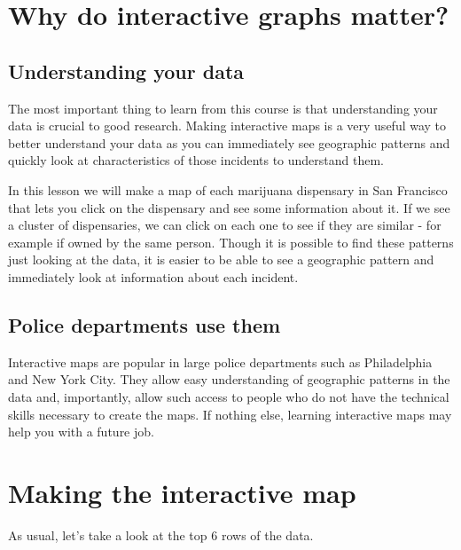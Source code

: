 \documentclass[
]{krantz}
\begin{document}
\hypertarget{why-do-interactive-graphs-matter}{%
\section{Why do interactive graphs matter?}\label{why-do-interactive-graphs-matter}}

\hypertarget{understanding-your-data}{%
\subsection{Understanding your data}\label{understanding-your-data}}

The most important thing to learn from this course is that understanding your data is crucial to good research. Making interactive maps is a very useful way to better understand your data as you can immediately see geographic patterns and quickly look at characteristics of those incidents to understand them.

In this lesson we will make a map of each marijuana dispensary in San Francisco that lets you click on the dispensary and see some information about it. If we see a cluster of dispensaries, we can click on each one to see if they are similar - for example if owned by the same person. Though it is possible to find these patterns just looking at the data, it is easier to be able to see a geographic pattern and immediately look at information about each incident.

\hypertarget{police-departments-use-them}{%
\subsection{Police departments use them}\label{police-departments-use-them}}

Interactive maps are popular in large police departments such as Philadelphia and New York City. They allow easy understanding of geographic patterns in the data and, importantly, allow such access to people who do not have the technical skills necessary to create the maps. If nothing else, learning interactive maps may help you with a future job.

\hypertarget{making-the-interactive-map}{%
\section{Making the interactive map}\label{making-the-interactive-map}}

As usual, let's take a look at the top 6 rows of the data.
\end{document}
